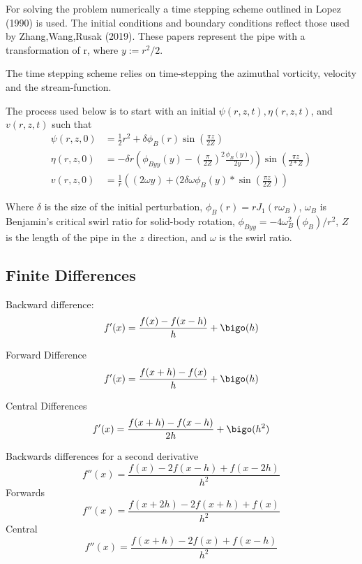 \documentclass{X:/Documents/Coding/Latex/myreport}
\begin{document}
For solving the problem numerically a time stepping scheme outlined in Lopez (1990) is used. The initial conditions and boundary conditions reflect those used by Zhang,Wang,Rusak (2019).
These papers represent the pipe with a transformation of r, where $y := r^2/2$. 

The time stepping scheme relies on time-stepping the azimuthal vorticity, velocity and the stream-function.

The process used below is to start with an initial $\psi(r,z,t), \eta(r,z,t)$, and $v(r,z,t)$ such that
\begin{align*}
    \psi(r,z,0) &= \frac12 r^2 + \delta \phi_B(r) \sin \left(\frac{\pi z}{2Z}\right)\\
    \eta(r,z,0) &= - \delta  r\left(\phi_{Byy}(y) - (\frac{\pi}{2Z})^2\frac{\phi_B(y)}{2y})\right)\sin(\frac{\pi z}{2*Z})\\
    v(r,z,0) &= \frac{1}{r} \left((2\omega y) + (2\delta\omega\phi_B(y)*\sin\left(\frac{\pi z}{2Z}\right)\right)
\end{align*}

Where $\delta$ is the size of the initial perturbation, $\phi_B(r) = r J_1(r \omega_B)$, $\omega_B$ is Benjamin's critical swirl ratio for solid-body rotation, $\phi_{Byy} = -4 \omega_B^2 (\phi_B)/r^2$, $Z$ is the length of the pipe in the $z$ direction, and $\omega$ is the swirl ratio.




\subsection{Finite Differences}
Backward difference:
\[f'(x) = \frac{f(x) - f(x-h)}{h} + \bigo(h)\]

Forward Difference
\[f'(x) = \frac{f(x+h) - f(x)}{h}+ \bigo(h)\]

Central Differences
\[f'(x) = \frac{f(x+h) - f(x-h)}{2h}+ \bigo(h^2)\]

Backwards differences for a second derivative
\[f''(x) = \frac{f(x) - 2f(x-h) + f(x-2h)}{h^2}\]
Forwards
\[f''(x) = \frac{f(x+2h) - 2f(x+h) + f(x)}{h^2}\]
Central 
\[f''(x) = \frac{f(x+h) - 2 f(x) + f(x-h)}{h^2}\]










\end{document}
